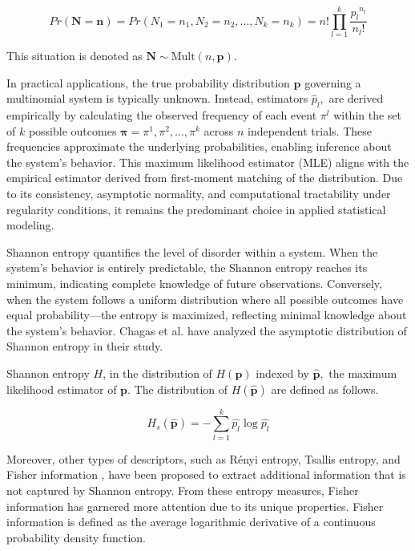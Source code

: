 \begin{equation}
	Pr(\bm{N=n})=Pr(N_1=n_1,N_2=n_2, \dots,N_k=n_k)=n!\prod_{l=1}^{k}\frac{{p_l}^{n_l}}{n_l !}
\end{equation}   

This situation is denoted as $\bm{N}\sim \text{Mult}(n,\bm{p}).$ \cite{Rey2023}
   
      
In practical applications, the true probability distribution $\bm{p}$ governing a multinomial system is typically unknown. Instead, estimators $\widehat{p}_l,$ are derived empirically by calculating the observed frequency of each event $\pi^l$ within the set of $k$ possible outcomes $\bm{\pi}=\pi^1,\pi^2, \dots, \pi^k$  across $n$ independent trials. These frequencies approximate the underlying probabilities, enabling inference about the system’s behavior. This maximum likelihood estimator (MLE) aligns with the empirical estimator derived from first-moment matching of the distribution. Due to its consistency, asymptotic normality, and computational tractability under regularity conditions, it remains the predominant choice in applied statistical modeling.

Shannon entropy quantifies the level of disorder within a system. When the system's behavior is entirely predictable, the Shannon entropy reaches its minimum, indicating complete knowledge of future observations. Conversely, when the system follows a uniform distribution where all possible outcomes have equal probability—the entropy is maximized, reflecting minimal knowledge about the system's behavior. Chagas et al. \cite{Chagas2022} have analyzed the asymptotic distribution of Shannon entropy in their study. 

Shannon entropy $H$, in the distribution of $H(\bm{p})$ indexed by $\widehat{\bm{p}},$ the maximum likelihood estimator of $\bm{p}$. The distribution of $H(\widehat{\bm{p}})$ are defined as follows. 

\begin{equation}
	H_s(\widehat{\bm{p}})=-\sum_{l=1}^{k}\widehat{p_l} \log\widehat{p_l}
\end{equation} 

Moreover, other types of descriptors, such as Rényi entropy\cite{renyi1961measures}, Tsallis entropy\cite{tsallis1988possible}, and Fisher information \cite{frieden2004science}, have been proposed to extract additional information that is not captured by Shannon entropy.
From these entropy measures, Fisher information has garnered more attention due to its unique properties. Fisher information is defined as the average logarithmic derivative of a continuous probability density function.

